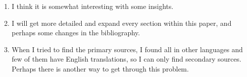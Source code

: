 \documentclass{article}
\begin{document}
\printbibliography

\newpage

\begin{enumerate}
    \item I think it is somewhat interesting with some insights.
    \item I will get more detailed and expand every section within this paper, and perhaps some changes in the bibliography.
    \item When I tried to find the primary sources, I found all in other languages and few of them have English translations, so I can only find secondary sources. Perhaps there is another way to get through this problem.
\end{enumerate}
\end{document}
